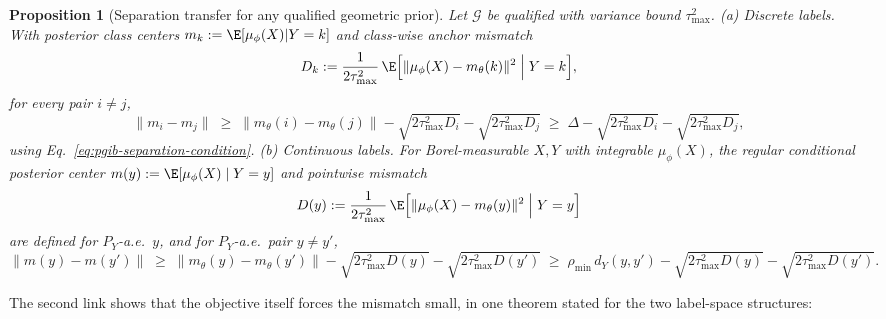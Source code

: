 \documentclass{article} %
\theoremstyle{plain}
\newtheorem{proposition}{Proposition}[section]
\theoremstyle{remark}
\begin{document}
\begin{proposition}[Separation transfer for any qualified geometric prior]
\label{prop:pgib-separation}
Let $\mathcal{G}$ be qualified with variance bound $\tau^2_{\max}$.
\emph{(a) Discrete labels.} With posterior class centers
$m_k := \E[\mu_\phi(X) | Y = k]$ and class-wise anchor mismatch
\begin{equation}
D_k := \frac{1}{2\tau^2_{\max}}\,
\E\Bigl[ \|\mu_\phi(X) - m_\theta(k)\|^2 \;\Big|\; Y = k \Bigr] ,
\label{eq:pgib-class-rate}
\end{equation}
for every pair $i \ne j$,
\begin{equation}
\|m_i - m_j\| \;\ge\; \|m_\theta(i) - m_\theta(j)\|
- \sqrt{2\tau^2_{\max} D_i} - \sqrt{2\tau^2_{\max} D_j}
\;\ge\; \Delta - \sqrt{2\tau^2_{\max} D_i} - \sqrt{2\tau^2_{\max} D_j} ,
\label{eq:pgib-separation}
\end{equation}
using Eq.~\eqref{eq:pgib-separation-condition}.
\emph{(b) Continuous labels.} For Borel-measurable $X, Y$ with integrable
$\mu_\phi(X)$, the regular conditional posterior center
$m(y) := \E[\mu_\phi(X) \mid Y = y]$ and pointwise mismatch
\begin{equation}
D(y) := \frac{1}{2\tau^2_{\max}}\,
\E\Bigl[ \|\mu_\phi(X) - m_\theta(y)\|^2 \;\Big|\; Y = y \Bigr]
\label{eq:pgib-class-rate-continuous}
\end{equation}
are defined for $P_Y$-a.e.\ $y$, and for $P_Y$-a.e.\ pair $y \ne y'$,
\begin{equation}
\|m(y) - m(y')\| \;\ge\; \|m_\theta(y) - m_\theta(y')\|
- \sqrt{2\tau^2_{\max} D(y)} - \sqrt{2\tau^2_{\max} D(y')}
\;\ge\; \rho_{\min}\, d_Y(y, y') - \sqrt{2\tau^2_{\max} D(y)} - \sqrt{2\tau^2_{\max} D(y')} .
\label{eq:pgib-separation-continuous}
\end{equation}
\end{proposition}

The second link shows that the objective itself forces the mismatch small, in one theorem stated for the two label-space
structures:
\end{document}
